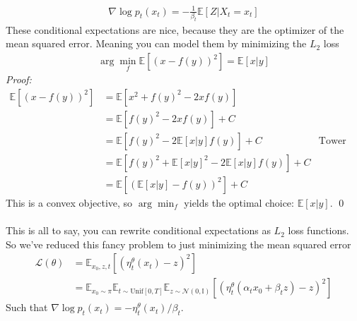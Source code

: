 \begin{align}
	\nabla \log p_t(x_t) = - \frac{1}{\beta_t} \mathbb E[Z | X_t = x_t]
\end{align}
These conditional expectations are nice, because they are the optimizer of the mean squared error. Meaning you can model them by minimizing the $L_2$ loss
\begin{align}
	\arg \min_f\mathbb E[(x - f(y))^2] = \mathbb E[x|y]
\end{align}
\emph{Proof:}
\begin{align}
	\mathbb E[(x - f(y))^2] & = \mathbb E[x^2 + f(y)^2 -2 x f(y)]\\
	& = \mathbb E[f(y)^2 - 2 x f(y)] + C\\
	& = \mathbb E[f(y)^2 - 2 \mathbb E[x | y] f(y)] + C & \text{Tower property}\\
	& = \mathbb E[f(y)^2 + \mathbb E[x|y]^2 - 2 \mathbb E[x|y]f(y)] + C\\
	& = \mathbb E[(\mathbb E[x|y] - f(y))^2] + C
\end{align}
This is a convex objective, so $\arg \min_f$ yields the optimal choice: $\mathbb E[x|y]$. \qed
\\
\\
This is all to say, you can rewrite conditional expectations as $L_2$ loss functions. So we've reduced this fancy problem to just minimizing the mean squared error
\begin{align}
	\mathcal L(\theta) & = \mathbb E_{x_0, z, t}[ (\eta^\theta_t(x_t) - z)^2] \\
	& = \mathbb E_{x_0 \sim \pi}\mathbb E_{t \sim \text{Unif}[0,T]} \mathbb E_{z \sim \mathcal N(0, \mathbb I)} [(\eta^\theta_t(\alpha_t x_0 + \beta_t z) - z)^2]
\end{align}
Such that $\nabla \log p_t(x_t) = - \eta^\theta_t(x_t) / \beta_t$.

